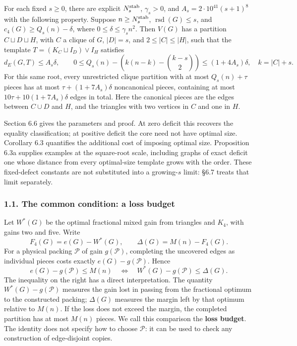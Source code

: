 \documentclass[english,11pt,a4paper]{article}
\begin{document}
For each fixed \(s\ge0\), there are explicit \(N_s^{\rm stab}\), \(\gamma_s>0\), and \(A_s=2\cdot10^{41}(s+1)^8\) with the following property. Suppose \(n\ge N_s^{\rm stab}\), \(\operatorname{rsd}(G)\le s\), and \(c_4(G)\ge Q_s(n)-\delta\), where \(0\le\delta\le\gamma_s n^2\). Then \(V(G)\) has a partition \(C\sqcup D\sqcup H\), with \(C\) a clique of \(G\), \(|D|=s\), and \(2\le |C|\le |H|\), such that the template \(T=(K_C\sqcup I_D)\vee I_H\) satisfies \[
d_E(G,T)\le A_s\delta,\qquad
0\le Q_s(n)-\left(k(n-k)-\binom{k-s}{2}\right)\le(1+4A_s)\delta,
\quad k=|C|+s.
\] For this same root, every unrestricted clique partition with at most \(Q_s(n)+\tau\) pieces has at most \(\tau+(1+7A_s)\delta\) noncanonical pieces, containing at most \(10\tau+10(1+7A_s)\delta\) edges in total. Here the canonical pieces are the edges between \(C\cup D\) and \(H\), and the triangles with two vertices in \(C\) and one in \(H\).

Section 6.6 gives the parameters and proof. At zero deficit this recovers the equality classification; at positive deficit the core need not have optimal size. Corollary 6.3 quantifies the additional cost of imposing optimal size. Proposition 6.3a supplies examples at the square-root scale, including graphs of exact deficit one whose distance from every optimal-size template grows with the order. These fixed-defect constants are not substituted into a growing-\(s\) limit: §6.7 treats that limit separately.

\subsubsection{1.1. The common condition: a loss budget}\label{the-common-condition-a-loss-budget}

Let \(W^*(G)\) be the optimal fractional mixed gain from triangles and \(K_4\), with gains two and five. Write \[
F_4(G)=e(G)-W^*(G),\qquad \Delta(G)=M(n)-F_4(G).
\] For a physical packing \(\mathcal P\) of gain \(g(\mathcal P)\), completing the uncovered edges as individual pieces costs exactly \(e(G)-g(\mathcal P)\). Hence \[
\boxed{
e(G)-g(\mathcal P)\le M(n)
\quad\Longleftrightarrow\quad
W^*(G)-g(\mathcal P)\le\Delta(G).
}
\tag{1.3}
\] The inequality on the right has a direct interpretation. The quantity \(W^*(G)-g(\mathcal P)\) measures the gain lost in passing from the fractional optimum to the constructed packing; \(\Delta(G)\) measures the margin left by that optimum relative to \(M(n)\). If the loss does not exceed the margin, the completed partition has at most \(M(n)\) pieces. We call this comparison the \textbf{loss budget}. The identity does not specify how to choose \(\mathcal P\): it can be used to check any construction of edge-disjoint copies.
\end{document}
